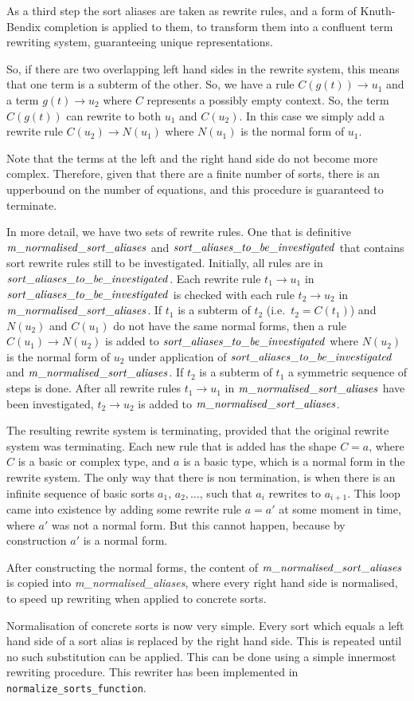 \documentclass{article}
\begin{document}
As a third step the sort aliases are taken as rewrite rules, and 
a form of Knuth-Bendix completion is applied to them, to transform them
into a confluent term rewriting system, guaranteeing unique representations.

So, if there are two overlapping left hand sides in the rewrite system, this
means that one term is a subterm of the other. So, we have a rule 
$C(g(t))\rightarrow u_1$ and a term $g(t)\rightarrow u_2$ where $C$ represents a
possibly empty context. So, the term
$C(g(t))$ can rewrite to both $u_1$ and $C(u_2)$. In this case we simply add
a rewrite rule $C(u_2)\rightarrow N(u_1)$ where $N(u_1)$ is the normal form
of $u_1$. 

Note that the terms at the left and
the right hand side do not become more complex. Therefore, given that there
are a finite number of sorts, there is an upperbound on the number of equations,
and this procedure is guaranteed to terminate.

In more detail, we have two sets of rewrite rules. One that is definitive
${\it m\_normalised\_sort\_aliases}$ and $\it sort\_aliases\_to\_be\_investigated$ 
that contains sort rewrite rules
still to be investigated. Initially, all rules are in 
$\it sort\_aliases\_to\_be\_investigated$. Each rewrite rule $t_1\rightarrow u_1$
in $\it sort\_aliases\_to\_be\_investigated$ is checked with
each rule $t_2\rightarrow u_2$ in ${\it m\_normalised\_sort\_aliases}$.
If $t_1$ is a subterm of $t_2$ (i.e.\ $t_2=C(t_1)$) and 
$N(u_2)$ and $C(u_1)$ do not have the same normal forms, then a rule $C(u_1)\rightarrow
N(u_2)$ is added to $\it sort\_aliases\_to\_be\_investigated$ where $N(u_2)$ is
the normal form of $u_2$ under application of $\it sort\_aliases\_to\_be\_investigated$ and
${\it m\_normalised\_sort\_aliases}$.
If $t_2$ is a subterm of $t_1$ a symmetric sequence of steps is done.
After all rewrite rules $t_1\rightarrow u_1$ in ${\it m\_normalised\_sort\_aliases}$
have been investigated, $t_2\rightarrow u_2$ is added to 
${\it m\_normalised\_sort\_aliases}$.

The resulting rewrite system is terminating, provided that the original rewrite system
was terminating. Each new rule that is added has the shape $C = a$, where $C$ is
a basic or complex type, and $a$ is a basic type, which is a normal form in the
rewrite system. The only way that there is non termination, is when there
is an infinite sequence of basic sorts $a_1$, $a_2,\ldots$, such that $a_i$ rewrites
to $a_{i+1}$. This loop came into existence by adding some rewrite rule $a=a'$ at
some moment in time, where $a'$ was not a normal form. But this cannot happen,
because by construction $a'$ is a normal form.

After constructing the normal forms, the content of ${\it m\_normalised\_sort\_aliases}$
is copied into {\it m\_normalised\_aliases}, where every right hand side is normalised,
to speed up rewriting when applied to concrete sorts.

Normalisation of concrete sorts is now very simple. Every sort which equals a
left hand side of a sort alias is replaced by the right hand side. This is repeated
until no such substitution can be applied. This can be done using a simple 
innermost rewriting procedure. This rewriter has been implemented in 
{\tt normalize\_sorts\_function}. 
\end{document}
